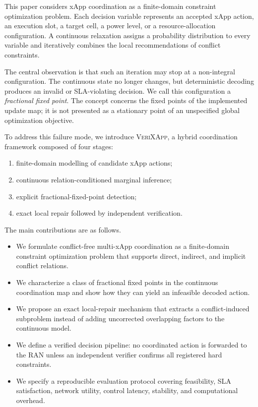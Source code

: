 \documentclass[pdflatex,sn-mathphys-num,iicol,oneside]{sn-jnl}
\newcommand{\method}{\textsc{VeriXApp}}
\begin{document}
This paper considers xApp coordination as a finite-domain constraint
optimization problem. Each decision variable represents an accepted
xApp action, an execution slot, a target cell, a power level, or a
resource-allocation configuration. A continuous relaxation assigns a
probability distribution to every variable and iteratively combines
the local recommendations of conflict constraints.

The central observation is that such an iteration may stop at a
non-integral configuration. The continuous state no longer changes,
but deterministic decoding produces an invalid or SLA-violating
decision. We call this configuration a \emph{fractional fixed point}.
The concept concerns the fixed points of the implemented update map;
it is not presented as a stationary point of an unspecified global
optimization objective.

To address this failure mode, we introduce \method, a hybrid
coordination framework composed of four stages:

\begin{enumerate}
    \item finite-domain modelling of candidate xApp actions;
    \item continuous relation-conditioned marginal inference;
    \item explicit fractional-fixed-point detection;
    \item exact local repair followed by independent verification.
\end{enumerate}

The main contributions are as follows.

\begin{itemize}
    \item We formulate conflict-free multi-xApp coordination as a
    finite-domain constraint optimization problem that supports
    direct, indirect, and implicit conflict relations.

    \item We characterize a class of fractional fixed points in the
    continuous coordination map and show how they can yield an
    infeasible decoded action.

    \item We propose an exact local-repair mechanism that extracts a
    conflict-induced subproblem instead of adding uncorrected
    overlapping factors to the continuous model.

    \item We define a verified decision pipeline: no coordinated
    action is forwarded to the RAN unless an independent verifier
    confirms all registered hard constraints.

    \item We specify a reproducible evaluation protocol covering
    feasibility, SLA satisfaction, network utility, control latency,
    stability, and computational overhead.
\end{itemize}
\end{document}
